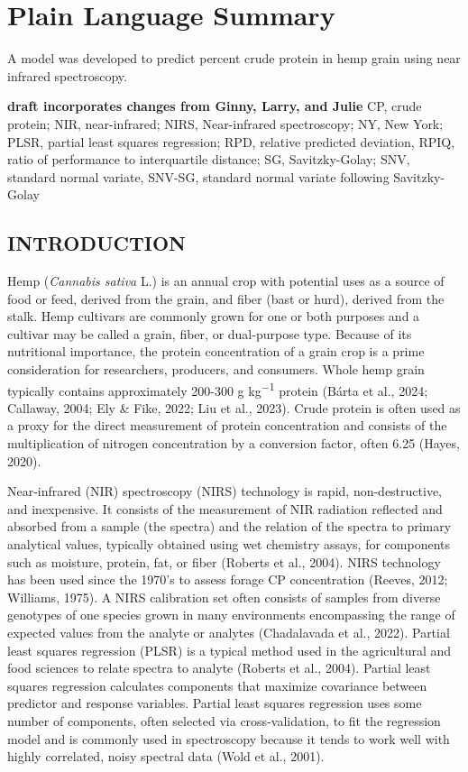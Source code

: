 \documentclass[
]{agujournal2019}
\begin{document}
\section*{Plain Language Summary}
A model was developed to predict percent crude protein in hemp grain
using near infrared spectroscopy.




\textbf{draft incorporates changes from Ginny, Larry, and Julie} CP,
crude protein; NIR, near-infrared; NIRS, Near-infrared spectroscopy; NY,
New York; PLSR, partial least squares regression; RPD, relative
predicted deviation, RPIQ, ratio of performance to interquartile
distance; SG, Savitzky-Golay; SNV, standard normal variate, SNV-SG,
standard normal variate following Savitzky-Golay

\subsection{INTRODUCTION}\label{introduction}

Hemp (\emph{Cannabis sativa} L.) is an annual crop with potential uses
as a source of food or feed, derived from the grain, and fiber (bast or
hurd), derived from the stalk. Hemp cultivars are commonly grown for one
or both purposes and a cultivar may be called a grain, fiber, or
dual-purpose type. Because of its nutritional importance, the protein
concentration of a grain crop is a prime consideration for researchers,
producers, and consumers. Whole hemp grain typically contains
approximately 200-300 g kg\textsuperscript{−1} protein (Bárta et al.,
2024; Callaway, 2004; Ely \& Fike, 2022; Liu et al., 2023). Crude
protein is often used as a proxy for the direct measurement of protein
concentration and consists of the multiplication of nitrogen
concentration by a conversion factor, often 6.25 (Hayes, 2020).

Near-infrared (NIR) spectroscopy (NIRS) technology is rapid,
non-destructive, and inexpensive. It consists of the measurement of NIR
radiation reflected and absorbed from a sample (the spectra) and the
relation of the spectra to primary analytical values, typically obtained
using wet chemistry assays, for components such as moisture, protein,
fat, or fiber (Roberts et al., 2004). NIRS technology has been used
since the 1970's to assess forage CP concentration (Reeves, 2012;
Williams, 1975). A NIRS calibration set often consists of samples from
diverse genotypes of one species grown in many environments encompassing
the range of expected values from the analyte or analytes (Chadalavada
et al., 2022). Partial least squares regression (PLSR) is a typical
method used in the agricultural and food sciences to relate spectra to
analyte (Roberts et al., 2004). Partial least squares regression
calculates components that maximize covariance between predictor and
response variables. Partial least squares regression uses some number of
components, often selected via cross-validation, to fit the regression
model and is commonly used in spectroscopy because it tends to work well
with highly correlated, noisy spectral data (Wold et al., 2001).
\end{document}

